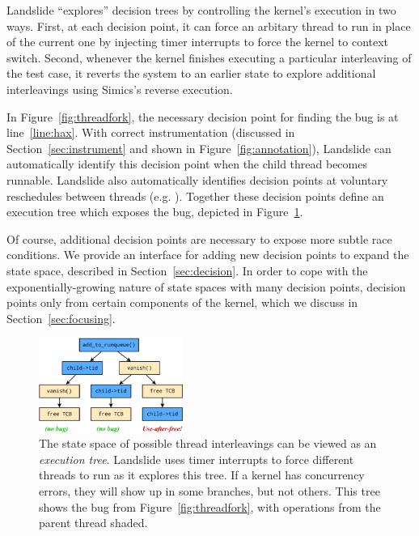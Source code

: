 Landslide ``explores'' decision trees by controlling the kernel's execution in two ways.
First, at each decision point, it can force an arbitary thread to run in place of the current one by injecting timer interrupts to force the kernel to context switch.
Second, whenever the kernel finishes executing a particular interleaving of the test case, it reverts the system to an earlier state to explore additional interleavings using Simics's reverse execution.

In Figure~\ref{fig:threadfork}, the necessary decision point for finding the bug is at line~\ref{line:hax}. With correct instrumentation (discussed in Section~\ref{sec:instrument} and shown in Figure~\ref{fig:annotation}), Landslide can automatically identify this decision point when the child thread becomes runnable.
Landslide also automatically identifies decision points at voluntary reschedules between threads (e.g. ). Together these decision points define an execution tree which exposes the bug, depicted in Figure~\ref{fig:tree}.

Of course, additional decision points are necessary to expose more subtle race conditions. We provide an interface for adding new decision points to expand the state space, described in Section~\ref{sec:decision}.
In order to cope with the exponentially-growing nature of state spaces with many decision points,
decision points only from certain components of the kernel, which we discuss in Section~\ref{sec:focusing}.

\begin{figure}[t]
	\centering
\includegraphics[width=0.42\textwidth]{threadfork/threadfork.pdf}
\caption{The state space of possible thread interleavings can be viewed as an {\em execution tree}.
Landslide uses timer interrupts to force different threads to run as it explores this tree.
If a kernel has concurrency errors, they will show up in some branches, but not others.
This tree shows the bug from Figure~\ref{fig:threadfork}, with operations from the parent thread shaded.
}
\label{fig:tree}
\end{figure}

